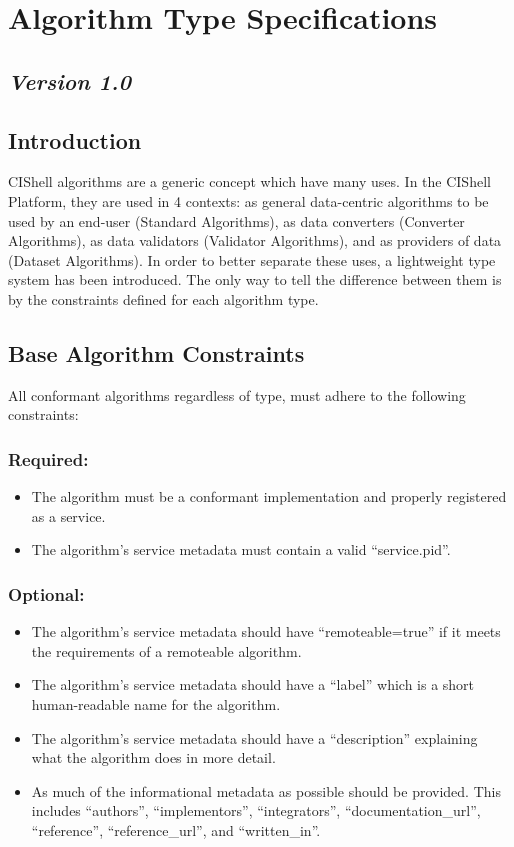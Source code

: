 \section{Algorithm Type Specifications}

\subsection*{\textit{Version 1.0}}

\label{algConstraints}
\subsection{Introduction}

CIShell algorithms are a generic concept which have many uses. In the CIShell
Platform, they are used in 4 contexts: as general data-centric algorithms to be
used by an end-user (Standard Algorithms), as data converters (Converter
Algorithms), as data validators (Validator Algorithms), and as providers of data
(Dataset Algorithms). In order to better separate these uses, a lightweight type
system has been introduced. The only way to tell the difference between them is
by the constraints defined for each algorithm type.

\subsection{Base Algorithm Constraints}

All conformant algorithms regardless of type, must adhere to the following
constraints:

\subsubsection*{Required:}
\begin{itemize}
  \item The algorithm must be a conformant 
  implementation and properly registered as a service.
  \item The algorithm's service metadata must contain a valid ``service.pid''.
\end{itemize}

\subsubsection*{Optional:}
\begin{itemize}
  \item The algorithm's service metadata should have ``remoteable=true'' if it
  meets the requirements of a remoteable algorithm.
  \item The algorithm's service metadata should have a ``label'' which is a
  short human-readable name for the algorithm.
  \item The algorithm's service metadata should have a ``description''
  explaining what the algorithm does in more detail.
  \item As much of the informational metadata as possible should be
  provided. This includes ``authors'', ``implementors'', ``integrators'',
  ``documentation\_url'', ``reference'', ``reference\_url'', and ``written\_in''.
\end{itemize}

